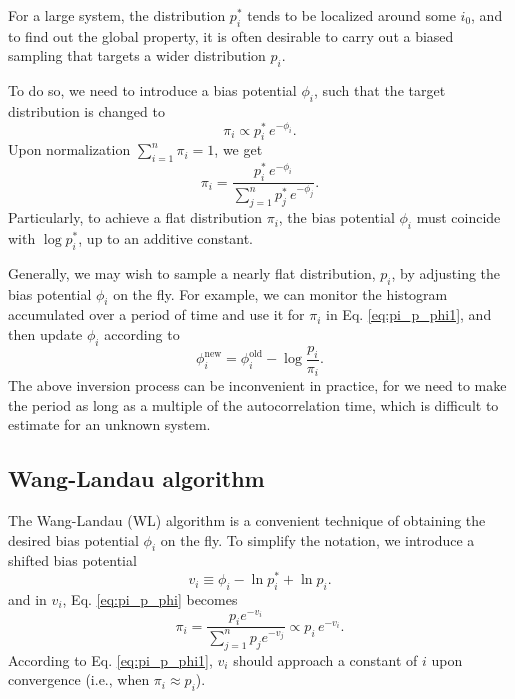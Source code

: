 \documentclass[reprint]{revtex4-1}
\begin{document}
For a large system,
the distribution $p^*_i$ tends to
be localized around some $i_0$,
%
and to find out the global property,
it is often desirable to carry out
a biased sampling that targets
a wider distribution $p_i$.
%



To do so, we need to introduce a bias potential $\phi_i$,
such that the target distribution is changed to
%
\begin{equation}
  \pi_i \propto p^*_i \, e^{-\phi_i}.
  \label{eq:pi_p_phi1}
\end{equation}
%
Upon normalization $\sum_{i = 1}^n \pi_i = 1$,
we get
%
\begin{equation}
  \pi_i =
  \frac{ p^*_i \, e^{-\phi_i} }
  { \sum_{j = 1}^n p^*_j \, e^{-\phi_j} }.
  \label{eq:pi_p_phi}
\end{equation}
%
Particularly,
to achieve a flat distribution $\pi_i$,
the bias potential $\phi_i$
must coincide with $\log p^*_i$,
up to an additive constant.



Generally, we may wish to sample
a nearly flat distribution, $p_i$,
by adjusting the bias potential $\phi_i$
on the fly.
%
For example,
we can monitor the histogram accumulated over
a period of time and use it for $\pi_i$ in
Eq. \eqref{eq:pi_p_phi1},
and then update
$\phi_i$ according to
$$
\phi_i^{\mathrm{new}}
=
\phi_i^{\mathrm{old}}
-
\log \frac{ p_i } { \pi_i }.
$$
%
%
The above inversion process can be inconvenient
in practice,
for we need to make the period
as long as a multiple of
the autocorrelation time,
which is difficult to estimate for an unknown system.



\subsection{Wang-Landau algorithm}



The Wang-Landau (WL) algorithm is a convenient technique
of obtaining the desired bias potential $\phi_i$
on the fly.
%
To simplify the notation, we introduce
a shifted bias potential
%
\begin{equation}
  v_i \equiv \phi_i - \ln p^*_i + \ln p_i.
  \label{eq:v_def}
\end{equation}
%
%
and in $v_i$, Eq. \eqref{eq:pi_p_phi}
becomes
%
\begin{equation}
  \pi_i = \frac{ p_i e^{-v_i} }
  { \sum_{j = 1}^n p_j e^{-v_j} }
  \propto p_i \, e^{-v_i}.
  \label{eq:pi_p_v}
\end{equation}
%
According to Eq. \eqref{eq:pi_p_phi1},
$v_i$ should approach a constant of $i$
upon convergence (i.e., when $\pi_i \approx p_i$).
\end{document}

